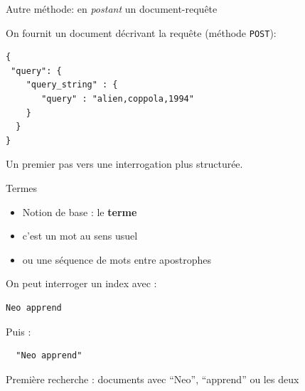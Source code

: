 \begin{frame}[fragile]{Autre méthode: en \textit{postant} un document-requête}

On fournit un document décrivant la requête (méthode \texttt{POST}):

\vfill

\begin{verbatim}
{
 "query": {
    "query_string" : {
       "query" : "alien,coppola,1994"
    }
  }
}
\end{verbatim}

\vfill

Un premier pas vers une interrogation plus structurée.


\end{frame}



\begin{frame}[fragile]{Termes}

  \begin{itemize}
    \item Notion de base : le {\bf terme}
    \item c'est un mot au sens usuel
    \item ou une séquence de mots entre apostrophes
  \end{itemize}
\smallskip
On peut interroger un index avec :
\begin{verbatim}
Neo apprend
\end{verbatim}
Puis :
\begin{verbatim}
  "Neo apprend"
\end{verbatim}
\vfill
\begin{blocgauche}
  Première recherche : documents avec ``Neo'', ``apprend'' ou les deux
\end{blocgauche}

\end{frame}

